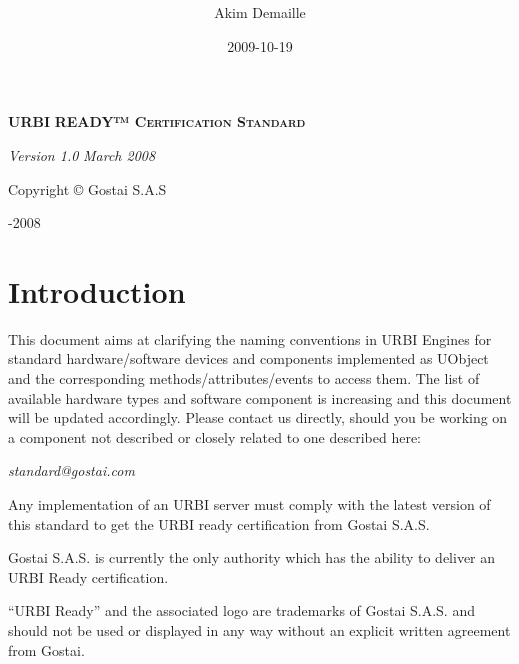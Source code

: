 \documentclass[a4paper]{article}
\title{ }
\author{Akim Demaille}
\date{2009-10-19}
\begin{document}
{\centering
\par}

{\centering
\textsf{\textbf{\textsc{URBI }}}\textsf{\textbf{\textsc{READY™
Certification Standard}}}
\par}

{\centering
\par}

{\centering
\textsf{\textit{Version 1.0}}  \textsf{\textit{March 2008}}
\par}

{\centering\sffamily
Copyright © Gostai S.A.S
\par}

{\centering{}-2008
\par}

\setcounter{tocdepth}{3}
\renewcommand\contentsname{}
\tableofcontents
\section[]{}
\section[Introduction]{Introduction}
{
\textsf{This document aims at clarifying the naming convention}\textsf{s
in URBI Engines for standard hardware/software devices and components
implemented as }UObject\textsf{ and the corresponding
methods/attributes/events to access them. The list of available
hardware types and software component is increasing and this document
will be updated accordingly. Please contact us directly, should you be
working on a component not described or closely related to one
described here:}}

{\centering\sffamily\itshape
standard@gostai.com
\par}

{\sffamily
Any implementation of an URBI server must comply with the latest version
of this standard to get the {\textquotedbl}URBI ready{\textquotedbl}
certification from Gostai S.A.S.}

{\sffamily
Gostai S.A.S. is currently the only authority which has the ability to
deliver an {\textquotedbl}URBI Ready{\textquotedbl} certification.}

{
“URBI Ready” and the associated logo are trademarks of Gostai S.A.S. and
should not be used or displayed in any way without an explicit written
agreement from Gostai.}
\end{document}
